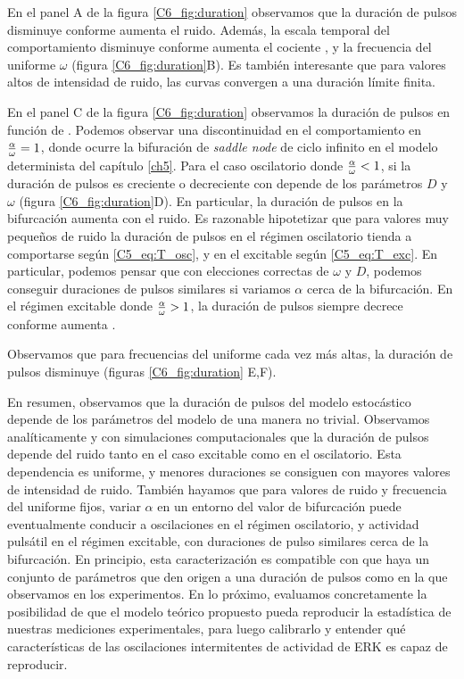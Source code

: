 \documentclass[./main.tex]{subfiles}
\begin{document}
En el panel A de la figura \ref{C6_fig:duration} observamos que la duración de pulsos disminuye conforme aumenta el ruido. Además, la escala temporal del comportamiento disminuye conforme aumenta el cociente \ddelta, y la frecuencia del uniforme $\omega$ (figura \ref{C6_fig:duration}B). Es también interesante que para valores altos de intensidad de ruido, las curvas convergen a una duración límite finita. 

En el panel C de la figura \ref{C6_fig:duration} observamos la duración de pulsos en función de \ddelta. Podemos observar una discontinuidad en el comportamiento en $\frac{\alpha}{\omega} = 1$, donde ocurre la bifuración de \textit{saddle node} de ciclo infinito en el modelo determinista del capítulo \ref{ch5}. Para el caso oscilatorio donde $\frac{\alpha}{\omega} < 1$, si la duración de pulsos es creciente o decreciente con \ddelta depende de los parámetros $D$ y $\omega$ (figura \ref{C6_fig:duration}D). En particular, la duración de pulsos en la bifurcación aumenta con el ruido. Es razonable hipotetizar que para valores muy pequeños de ruido la duración de pulsos en el régimen oscilatorio tienda a comportarse según \ref{C5_eq:T_osc}, y en el excitable según \ref{C5_eq:T_exc}. En particular, podemos pensar que con elecciones correctas de $\omega$ y $D$, podemos conseguir duraciones de pulsos similares si variamos $\alpha$ cerca de la bifurcación. En el régimen excitable donde $\frac{\alpha}{\omega} > 1$, la duración de pulsos siempre decrece conforme aumenta \ddelta. 

Observamos que para frecuencias del uniforme cada vez más altas, la duración de pulsos disminuye (figuras \ref{C6_fig:duration} E,F).  


En resumen, observamos que la duración de pulsos del modelo estocástico depende de los parámetros del modelo de una manera no trivial. Observamos analíticamente y con simulaciones computacionales que la duración de pulsos depende del ruido tanto en el caso excitable como en el oscilatorio. Esta dependencia es uniforme, y menores duraciones se consiguen con mayores valores de intensidad de ruido. También hayamos que para valores de ruido y frecuencia del uniforme fijos, variar $\alpha$ en un entorno del valor de bifurcación puede eventualmente conducir a oscilaciones en el régimen oscilatorio, y actividad pulsátil en el régimen excitable, con duraciones de pulso similares cerca de la bifurcación. En principio, esta caracterización es compatible con que haya un conjunto de parámetros que den origen a una duración de pulsos como en la que observamos en los experimentos. En lo próximo, evaluamos concretamente la posibilidad de que el modelo teórico propuesto pueda reproducir la estadística de nuestras mediciones experimentales, para luego calibrarlo y entender qué características de las oscilaciones intermitentes de actividad de ERK es capaz de reproducir. 
\end{document}

